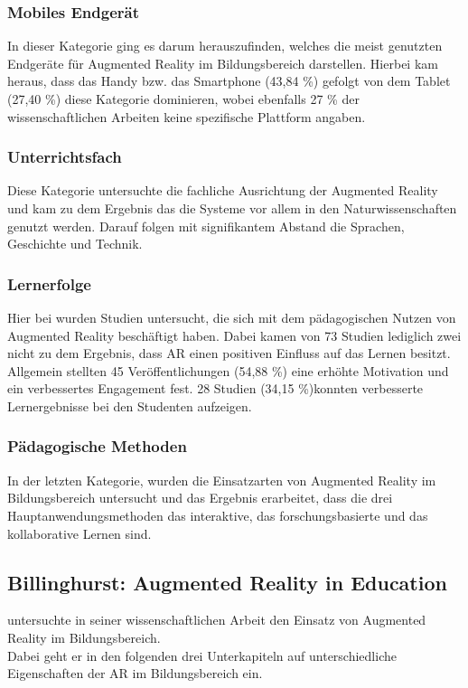 \subsubsection{Mobiles Endgerät}
In dieser Kategorie ging es darum herauszufinden, welches die meist genutzten Endgeräte für Augmented Reality im Bildungsbereich darstellen. Hierbei kam heraus, dass das Handy bzw. das Smartphone (43,84 \%) gefolgt von dem Tablet (27,40 \%) diese Kategorie dominieren, wobei ebenfalls 27 \% der wissenschaftlichen Arbeiten keine spezifische Plattform angaben. \citep[S. 80]{hedberg:review-ar-learning}

\subsubsection{Unterrichtsfach}
Diese Kategorie untersuchte die fachliche Ausrichtung der Augmented Reality und kam zu dem Ergebnis das die Systeme vor allem in den Naturwissenschaften genutzt werden. Darauf folgen mit signifikantem Abstand die Sprachen, Geschichte und Technik. \citep[S. 81]{hedberg:review-ar-learning}

\subsubsection{Lernerfolge}
Hier bei wurden Studien untersucht, die sich mit dem pädagogischen Nutzen von Augmented Reality beschäftigt haben. Dabei kamen von 73 Studien lediglich zwei nicht zu dem Ergebnis, dass AR einen positiven Einfluss auf das Lernen besitzt.\\
Allgemein stellten 45 Veröffentlichungen (54,88 \%) eine erhöhte Motivation und ein verbessertes Engagement fest. 28 Studien (34,15 \%)konnten verbesserte Lernergebnisse bei den Studenten aufzeigen.  \citep[S. 81-82]{hedberg:review-ar-learning}

\subsubsection{Pädagogische Methoden}
In der letzten Kategorie, wurden die Einsatzarten von Augmented Reality im Bildungsbereich untersucht und das Ergebnis erarbeitet, dass die drei Hauptanwendungsmethoden das interaktive, das forschungsbasierte und das kollaborative Lernen sind. \citep[S. 82]{hedberg:review-ar-learning}


\subsection{Billinghurst: Augmented Reality in Education}\label{sec:billinghurst-ar-education}
\citeauthor{billinghurst:ar-in-education} untersuchte in seiner wissenschaftlichen Arbeit \citep{billinghurst:ar-in-education} den Einsatz von Augmented Reality im Bildungsbereich.\\
Dabei geht er in den folgenden drei Unterkapiteln auf unterschiedliche Eigenschaften der AR im Bildungsbereich ein.

